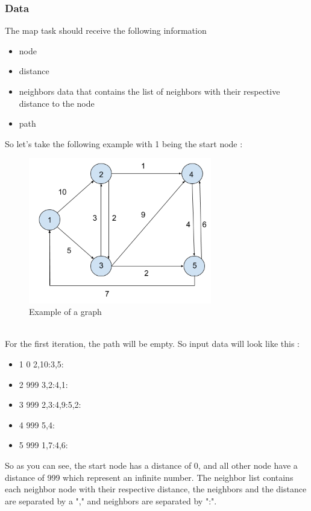 \documentclass[english]{article}
\begin{document}
\subsubsection{Data}
The map task should receive the following information
\begin{itemize}
\item node
\item distance
\item neighbors data that contains the list of neighbors with their respective distance to the node
\item path
\end{itemize}
So let's take the following example with 1 being the start node :
\begin{figure}[h]
\centering
\includegraphics[width=8cm]{img/data-example.png}
\caption{Example of a graph}
\end{figure}
\\
For the first iteration, the path will be empty. So input data will look like this :
\begin{itemize}
\item 1 0 2,10:3,5:
\item 2 999 3,2:4,1:
\item 3 999 2,3:4,9:5,2: 
\item 4 999 5,4:
\item 5 999 1,7:4,6:
\end{itemize}
So as you can see, the start node has a distance of 0, and all other node have a distance of 999 which represent an infinite number. The neighbor list contains each neighbor node with their respective distance, the neighbors and the distance are separated by a "," and neighbors are separated by ":".
\end{document}
